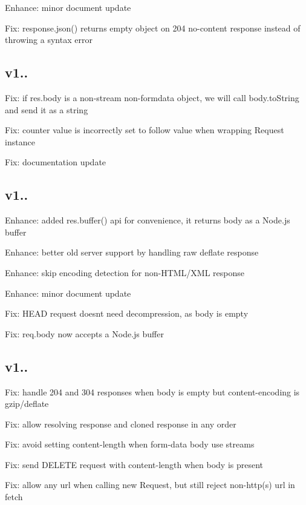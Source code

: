 \begin{DoxyItemize}
\item Enhance\+: minor document update
\item Fix\+: response.\+json() returns empty object on 204 no-\/content response instead of throwing a syntax error
\end{DoxyItemize}

\subsection*{v1..}


\begin{DoxyItemize}
\item Fix\+: if {\ttfamily res.\+body} is a non-\/stream non-\/formdata object, we will call {\ttfamily body.\+to\+String} and send it as a string
\item Fix\+: {\ttfamily counter} value is incorrectly set to {\ttfamily follow} value when wrapping Request instance
\item Fix\+: documentation update
\end{DoxyItemize}

\subsection*{v1..}


\begin{DoxyItemize}
\item Enhance\+: added {\ttfamily res.\+buffer()} api for convenience, it returns body as a Node.\+js buffer
\item Enhance\+: better old server support by handling raw deflate response
\item Enhance\+: skip encoding detection for non-\/\+H\+T\+M\+L/\+X\+ML response
\item Enhance\+: minor document update
\item Fix\+: H\+E\+AD request doesn\textquotesingle{}t need decompression, as body is empty
\item Fix\+: {\ttfamily req.\+body} now accepts a Node.\+js buffer
\end{DoxyItemize}

\subsection*{v1..}


\begin{DoxyItemize}
\item Fix\+: handle 204 and 304 responses when body is empty but content-\/encoding is gzip/deflate
\item Fix\+: allow resolving response and cloned response in any order
\item Fix\+: avoid setting {\ttfamily content-\/length} when {\ttfamily form-\/data} body use streams
\item Fix\+: send D\+E\+L\+E\+TE request with content-\/length when body is present
\item Fix\+: allow any url when calling new Request, but still reject non-\/http(s) url in fetch
\end{DoxyItemize}

